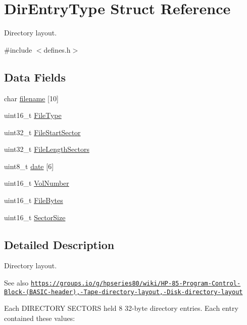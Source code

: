 \hypertarget{structDirEntryType}{}\section{Dir\+Entry\+Type Struct Reference}
\label{structDirEntryType}


Directory layout.  




{\ttfamily \#include $<$defines.\+h$>$}

\subsection*{Data Fields}
\begin{DoxyCompactItemize}
\item 
char \hyperlink{structDirEntryType_aa60fae0a6b7ba9c966cbcf46e555f396}{filename} \mbox{[}10\mbox{]}
\item 
uint16\+\_\+t \hyperlink{structDirEntryType_a97b6ddc8d198c32bf4a29c4784ab7188}{File\+Type}
\item 
uint32\+\_\+t \hyperlink{structDirEntryType_a062849a9cc935042c7a3a28ed90ab6a1}{File\+Start\+Sector}
\item 
uint32\+\_\+t \hyperlink{structDirEntryType_a0ad3a6b6da198caa68e7e82d025975cb}{File\+Length\+Sectors}
\item 
uint8\+\_\+t \hyperlink{structDirEntryType_a1850264d3e4eac53b665a702ac7000fd}{date} \mbox{[}6\mbox{]}
\item 
uint16\+\_\+t \hyperlink{structDirEntryType_a2fe2eefd68aafcce0bb14bf53e4cba00}{Vol\+Number}
\item 
uint16\+\_\+t \hyperlink{structDirEntryType_a3251ab2e011f1c428b051cb4d974a529}{File\+Bytes}
\item 
uint16\+\_\+t \hyperlink{structDirEntryType_ab92ab53cd08e0ffe0f0098c583ce5eba}{Sector\+Size}
\end{DoxyCompactItemize}


\subsection{Detailed Description}
Directory layout. 

\begin{DoxySeeAlso}{See also}
\href{https://groups.io/g/hpseries80/wiki/HP-85-Program-Control-Block-(BASIC-header),-Tape-directory-layout,-Disk-directory-layout}{\tt https\+://groups.\+io/g/hpseries80/wiki/\+H\+P-\/85-\/\+Program-\/\+Control-\/\+Block-\/(\+B\+A\+S\+I\+C-\/header),-\/\+Tape-\/directory-\/layout,-\/\+Disk-\/directory-\/layout}
\end{DoxySeeAlso}
Each D\+I\+R\+E\+C\+T\+O\+RY S\+E\+C\+T\+O\+RS held 8 32-\/byte directory entries. Each entry contained these values\+:

